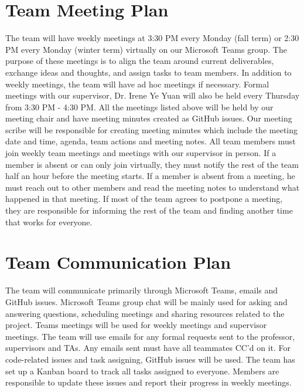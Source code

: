\documentclass{article}
\begin{document}
\section{Team Meeting Plan}
\quad The team will have weekly meetings at 3:30 PM every Monday (fall term) or 2:30 PM every Monday (winter term) virtually on our Microsoft Teams group. The purpose of these meetings is to align the team around current deliverables, exchange ideas and thoughts, and assign tasks to team members. In addition to weekly meetings,  the team will have ad hoc meetings if necessary. Formal meetings with our supervisor, Dr. Irene Ye Yuan will also be held every Thursday from 3:30 PM - 4:30 PM.  All the meetings listed above will be held by our meeting chair and have meeting minutes created as GitHub issues. Our meeting scribe will be responsible for creating meeting minutes which include the meeting date and time,  agenda, team actions and meeting notes.
\quad All team members must join weekly team meetings and meetings with our supervisor in person.  If a member is absent or can only join virtually,  they must notify the rest of the team half an hour before the meeting starts.  If a member is absent from a meeting,  he must reach out to other members and read the meeting notes to understand what happened in that meeting.  If most of the team agrees to postpone a meeting,  they are responsible for informing the rest of the team and finding another time that works for everyone.

\section{Team Communication Plan}
\quad The team will communicate primarily through Microsoft Teams,  emails and GitHub issues. Microsoft Teams group chat will be mainly used for asking and answering questions, scheduling meetings and sharing resources related to the project. Teams meetings will be used for weekly meetings and supervisor meetings. 
\quad The team will use emails for any formal requests sent to the professor, supervisors and TAs. Any emails sent must have all teammates CC'd on it.
\quad For code-related issues and task assigning, GitHub issues will be used. The team has set up a Kanban board to track all tasks assigned to everyone. Members are responsible to update these issues and report their progress in weekly meetings.
\end{document}
